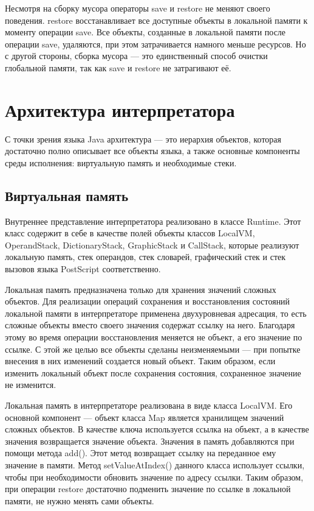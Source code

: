 \documentclass[14pt]{extarticle}
\begin{document}
Несмотря на сборку мусора операторы save и restore не меняют своего поведения. restore восстанавливает все доступные объекты в локальной памяти к моменту операции save. Все объекты, созданные в локальной памяти после операции save, удаляются, при этом затрачивается намного меньше ресурсов. Но с другой стороны, сборка мусора --- это единственный способ очистки глобальной памяти, так как save и restore не затрагивают её.


\pagebreak
\section{Архитектура интерпретатора}
С точки зрения языка Java архитектура --- это иерархия объектов, которая достаточно полно описывает все объекты языка, а также основные компоненты среды исполнения: виртуальную память и необходимые стеки. 

\subsection{Виртуальная память}
Внутреннее представление интерпретатора реализовано в классе Runtime. Этот класс содержит в себе в качестве полей объекты классов LocalVM, OperandStack, DictionaryStack, GraphicStack и CallStack, которые реализуют локальную память, стек операндов, стек словарей, графический стек и стек вызовов языка PostScript соответственно.

Локальная память предназначена только для хранения значений сложных объектов. Для реализации операций сохранения и восстановления состояний локальной памяти в интерпретаторе применена двухуровневая адресация, то есть сложные объекты вместо своего значения содержат ссылку на него. Благодаря этому во время операции восстановления меняется не объект, а его значение по ссылке. С этой же целью все объекты сделаны неизменяемыми --- при попытке внесения в них изменений создается новый объект. Таким образом, если изменить локальный объект после сохранения состояния, сохраненное значение не изменится.

Локальная память в интерпретаторе реализована в виде класса LocalVM. Его основной компонент --- объект класса Map является хранилищем значений сложных объектов. В качестве ключа используется ссылка на объект, а в качестве значения возвращается значение объекта. Значения в память добавляются при помощи метода add(). Этот метод возвращает ссылку на переданное ему значение в памяти. Метод setValueAtIndex() данного класса использует ссылки, чтобы при необходимости обновить значение по адресу ссылки. Таким образом, при операции restore достаточно подменить значение по ссылке в локальной памяти, не нужно менять сами объекты.
\end{document}
